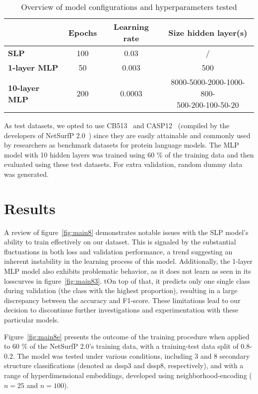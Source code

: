 \begin{table}[h]
    \caption{Overview of model configurations and hyperparameters tested}
    \label{tab:casp3}
    \centering
    \begin{tabular}{l|ccc}
        \toprule
         & Epochs & Learning rate & Size hidden layer(s)\\
        \midrule
        \textbf{SLP} & 100 & 0.03 & /\\
        \hline
        \textbf{1-layer MLP} & 50 & 0.003 & 500\\
        \hline
        \textbf{10-layer MLP} & 200 & 0.0003 & \makecell{8000-5000-2000-1000-800-\\500-200-100-50-20}\\
        \bottomrule
    \end{tabular}
  \end{table}

As test datasets, we opted to use CB513~\cite{cb513} and CASP12~\cite{casp12} (compiled by the developers of NetSurfP 2.0~\cite{netsurf}) since they are easily attainable and commonly used by researchers as benchmark datasets for protein language models. The MLP model with 10 hidden layers was trained using 60 \% of the training data and then evaluated using these test datasets. For extra validation, random dummy data was generated.

\section{Results}
A review of figure~\ref{fig:main8} demonstrates notable issues with the SLP model's ability to train effectively on our dataset. This is signaled by the substantial fluctuations in both loss and validation performance, a trend suggesting an inherent instability in the learning process of this model. Additionally, the 1-layer MLP model also exhibits problematic behavior, as it does not learn as seen in its losscurves in figure~\ref{fig:main83}. tOn top of that, it predicts only one single class during validation (the class with the highest proportion), resulting in a large discrepancy between the accuracy and F1-score. These limitations lead to our decision to discontinue further investigations and experimentation with these particular models.

Figure~\ref{fig:main8e} presents the outcome of the training procedure when applied to 60 \% of the NetSurfP 2.0's training data, with a training-test data split of 0.8-0.2. The model was tested under various conditions, including 3 and 8 secondary structure classifications (denoted as dssp3 and dssp8, respectively), and with a range of hyperdimensional embeddings, developed using neighborhood-encoding ($n = 25$ and $n=100$).

